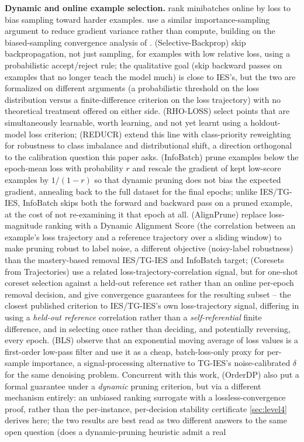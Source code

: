 \documentclass{article}
\theoremstyle{plain}
\theoremstyle{definition}
\theoremstyle{remark}
\begin{document}
\textbf{Dynamic and online example selection.} \citet{loshchilov2015online} rank minibatches online by loss to bias sampling toward harder examples. \citet{katharopoulos2018not} use a similar importance-sampling argument to reduce gradient variance rather than compute, building on the biased-sampling convergence analysis of \citet{needell2014stochastic}. \citet{jiang2019accelerating} (Selective-Backprop) skip backpropagation, not just sampling, for examples with low relative loss, using a probabilistic accept/reject rule; the qualitative goal (skip backward passes on examples that no longer teach the model much) is close to IES's, but the two are formalized on different arguments (a probabilistic threshold on the loss distribution versus a finite-difference criterion on the loss trajectory) with no theoretical treatment offered on either side. \citet{mindermann2022prioritized} (RHO-LOSS) select points that are simultaneously learnable, worth learning, and not yet learnt using a holdout-model loss criterion; \citet{bankes2024reducr} (REDUCR) extend this line with class-priority reweighting for robustness to class imbalance and distributional shift, a direction orthogonal to the calibration question this paper asks. \citet{qin2024infobatch} (InfoBatch) prune examples below the epoch-mean loss with probability $r$ and rescale the gradient of kept low-score examples by $1/(1-r)$ so that dynamic pruning does not bias the expected gradient, annealing back to the full dataset for the final epochs; unlike IES/TG-IES, InfoBatch skips both the forward and backward pass on a pruned example, at the cost of not re-examining it that epoch at all. \citet{qin2026alignprune} (AlignPrune) replace loss-magnitude ranking with a Dynamic Alignment Score (the correlation between an example's loss trajectory and a reference trajectory over a sliding window) to make pruning robust to label noise, a different objective (noisy-label robustness) than the mastery-based removal IES/TG-IES and InfoBatch target; \citet{nagaraj2025coresets} (Coresets from Trajectories) use a related loss-trajectory-correlation signal, but for one-shot coreset selection against a held-out reference set rather than an online per-epoch removal decision, and give convergence guarantees for the resulting subset -- the closest published criterion to IES/TG-IES's own loss-trajectory signal, differing in using a \emph{held-out reference} correlation rather than a \emph{self-referential} finite difference, and in selecting once rather than deciding, and potentially reversing, every epoch. \citet{zhou2026bls} (BLS) observe that an exponential moving average of loss values is a first-order low-pass filter and use it as a cheap, batch-loss-only proxy for per-sample importance, a signal-processing alternative to TG-IES's noise-calibrated $\delta$ for the same denoising problem. Concurrent with this work, \citet{jin2026orderdp} (OrderDP) also put a formal guarantee under a \emph{dynamic} pruning criterion, but via a different mechanism entirely: an unbiased ranking surrogate with a lossless-convergence proof, rather than the per-instance, per-decision stability certificate \cref{sec:level4} derives here; the two results are best read as two different answers to the same open question (does a dynamic-pruning heuristic admit a real 
\end{document}
